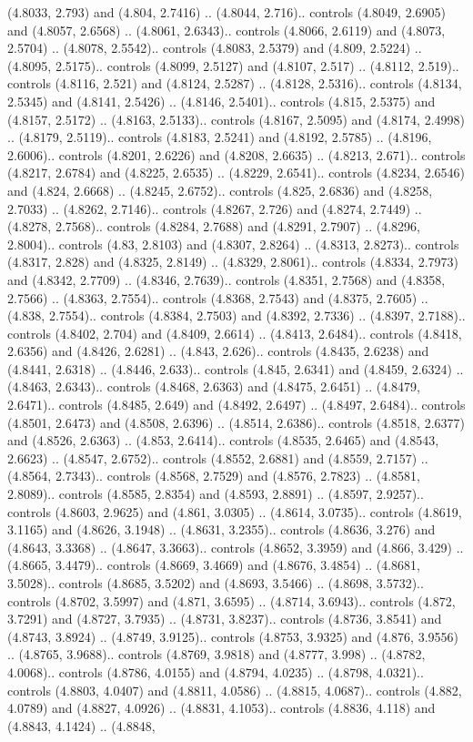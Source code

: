 (4.8033, 2.793) and (4.804, 2.7416) .. (4.8044, 2.716).. controls (4.8049, 2.6905) and (4.8057, 2.6568) .. (4.8061, 2.6343).. controls (4.8066, 2.6119) and (4.8073, 2.5704) .. (4.8078, 2.5542).. controls (4.8083, 2.5379) and (4.809, 2.5224) .. (4.8095, 2.5175).. controls (4.8099, 2.5127) and (4.8107, 2.517) .. (4.8112, 2.519).. controls (4.8116, 2.521) and (4.8124, 2.5287) .. (4.8128, 2.5316).. controls (4.8134, 2.5345) and (4.8141, 2.5426) .. (4.8146, 2.5401).. controls (4.815, 2.5375) and (4.8157, 2.5172) .. (4.8163, 2.5133).. controls (4.8167, 2.5095) and (4.8174, 2.4998) .. (4.8179, 2.5119).. controls (4.8183, 2.5241) and (4.8192, 2.5785) .. (4.8196, 2.6006).. controls (4.8201, 2.6226) and (4.8208, 2.6635) .. (4.8213, 2.671).. controls (4.8217, 2.6784) and (4.8225, 2.6535) .. (4.8229, 2.6541).. controls (4.8234, 2.6546) and (4.824, 2.6668) .. (4.8245, 2.6752).. controls (4.825, 2.6836) and (4.8258, 2.7033) .. (4.8262, 2.7146).. controls (4.8267, 2.726) and (4.8274, 2.7449) .. (4.8278, 2.7568).. controls (4.8284, 2.7688) and (4.8291, 2.7907) .. (4.8296, 2.8004).. controls (4.83, 2.8103) and (4.8307, 2.8264) .. (4.8313, 2.8273).. controls (4.8317, 2.828) and (4.8325, 2.8149) .. (4.8329, 2.8061).. controls (4.8334, 2.7973) and (4.8342, 2.7709) .. (4.8346, 2.7639).. controls (4.8351, 2.7568) and (4.8358, 2.7566) .. (4.8363, 2.7554).. controls (4.8368, 2.7543) and (4.8375, 2.7605) .. (4.838, 2.7554).. controls (4.8384, 2.7503) and (4.8392, 2.7336) .. (4.8397, 2.7188).. controls (4.8402, 2.704) and (4.8409, 2.6614) .. (4.8413, 2.6484).. controls (4.8418, 2.6356) and (4.8426, 2.6281) .. (4.843, 2.626).. controls (4.8435, 2.6238) and (4.8441, 2.6318) .. (4.8446, 2.633).. controls (4.845, 2.6341) and (4.8459, 2.6324) .. (4.8463, 2.6343).. controls (4.8468, 2.6363) and (4.8475, 2.6451) .. (4.8479, 2.6471).. controls (4.8485, 2.649) and (4.8492, 2.6497) .. (4.8497, 2.6484).. controls (4.8501, 2.6473) and (4.8508, 2.6396) .. (4.8514, 2.6386).. controls (4.8518, 2.6377) and (4.8526, 2.6363) .. (4.853, 2.6414).. controls (4.8535, 2.6465) and (4.8543, 2.6623) .. (4.8547, 2.6752).. controls (4.8552, 2.6881) and (4.8559, 2.7157) .. (4.8564, 2.7343).. controls (4.8568, 2.7529) and (4.8576, 2.7823) .. (4.8581, 2.8089).. controls (4.8585, 2.8354) and (4.8593, 2.8891) .. (4.8597, 2.9257).. controls (4.8603, 2.9625) and (4.861, 3.0305) .. (4.8614, 3.0735).. controls (4.8619, 3.1165) and (4.8626, 3.1948) .. (4.8631, 3.2355).. controls (4.8636, 3.276) and (4.8643, 3.3368) .. (4.8647, 3.3663).. controls (4.8652, 3.3959) and (4.866, 3.429) .. (4.8665, 3.4479).. controls (4.8669, 3.4669) and (4.8676, 3.4854) .. (4.8681, 3.5028).. controls (4.8685, 3.5202) and (4.8693, 3.5466) .. (4.8698, 3.5732).. controls (4.8702, 3.5997) and (4.871, 3.6595) .. (4.8714, 3.6943).. controls (4.872, 3.7291) and (4.8727, 3.7935) .. (4.8731, 3.8237).. controls (4.8736, 3.8541) and (4.8743, 3.8924) .. (4.8749, 3.9125).. controls (4.8753, 3.9325) and (4.876, 3.9556) .. (4.8765, 3.9688).. controls (4.8769, 3.9818) and (4.8777, 3.998) .. (4.8782, 4.0068).. controls (4.8786, 4.0155) and (4.8794, 4.0235) .. (4.8798, 4.0321).. controls (4.8803, 4.0407) and (4.8811, 4.0586) .. (4.8815, 4.0687).. controls (4.882, 4.0789) and (4.8827, 4.0926) .. (4.8831, 4.1053).. controls (4.8836, 4.118) and (4.8843, 4.1424) .. (4.8848, 